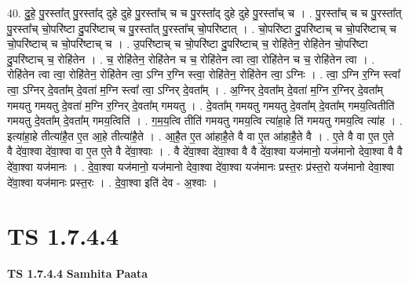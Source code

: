 \documentclass[17pt]{extarticle}
\begin{document}
40. दु॒हे॒ पु॒रस्ता᳚त् पु॒रस्ता᳚द् दुहे दुहे पु॒रस्ता᳚च् च च पु॒रस्ता᳚द् दुहे दुहे पु॒रस्ता᳚च् च । . पु॒रस्ता᳚च् च च पु॒रस्ता᳚त् पु॒रस्ता᳚च् चो॒परि॑ष्टा दु॒परि॑ष्टाच् च पु॒रस्ता᳚त् पु॒रस्ता᳚च् चो॒परि॑ष्टात् । . चो॒परि॑ष्टा दु॒परि॑ष्टाच् च चो॒परि॑ष्टाच् च चो॒परि॑ष्टाच् च चो॒परि॑ष्टाच् च । . उ॒परि॑ष्टाच् च चो॒परि॑ष्टा दु॒परि॑ष्टाच् च॒ रोहि॑तेन॒ रोहि॑तेन चो॒परि॑ष्टा दु॒परि॑ष्टाच् च॒ रोहि॑तेन । . च॒ रोहि॑तेन॒ रोहि॑तेन च च॒ रोहि॑तेन त्वा त्वा॒ रोहि॑तेन च च॒ रोहि॑तेन त्वा । . रोहि॑तेन त्वा त्वा॒ रोहि॑तेन॒ रोहि॑तेन त्वा॒ ऽग्नि र॒ग्नि स्त्वा॒ रोहि॑तेन॒ रोहि॑तेन त्वा॒ ऽग्निः । . त्वा॒ ऽग्नि र॒ग्नि स्त्वा᳚ त्वा॒ ऽग्निर् दे॒वता᳚म् दे॒वता॑ म॒ग्नि स्त्वा᳚ त्वा॒ ऽग्निर् दे॒वता᳚म् । . अ॒ग्निर् दे॒वता᳚म् दे॒वता॑ म॒ग्नि र॒ग्निर् दे॒वता᳚म् गमयतु गमयतु दे॒वता॑ म॒ग्नि र॒ग्निर् दे॒वता᳚म् गमयतु । . दे॒वता᳚म् गमयतु गमयतु दे॒वता᳚म् दे॒वता᳚म् गमय॒त्वितीति॑ गमयतु दे॒वता᳚म् दे॒वता᳚म् गमय॒त्विति॑ । . ग॒म॒य॒त्वि तीति॑ गमयतु गमय॒त्वि त्या॑हा॒हे ति॑ गमयतु गमय॒त्वि त्या॑ह । . इत्या॑हा॒हे तीत्या॑है॒त ए॒त आ॒हे तीत्या॑है॒ते । . आ॒है॒त ए॒त आ॑हाहै॒ते वै वा ए॒त आ॑हाहै॒ते वै । . ए॒ते वै वा ए॒त ए॒ते वै दे॑वा॒श्वा दे॑वा॒श्वा वा ए॒त ए॒ते वै दे॑वा॒श्वाः । . वै दे॑वा॒श्वा दे॑वा॒श्वा वै वै दे॑वा॒श्वा यज॑मानो॒ यज॑मानो देवा॒श्वा वै वै दे॑वा॒श्वा यज॑मानः । . दे॒वा॒श्वा यज॑मानो॒ यज॑मानो देवा॒श्वा दे॑वा॒श्वा यज॑मानः प्रस्त॒रः प्र॑स्त॒रो यज॑मानो देवा॒श्वा दे॑वा॒श्वा यज॑मानः प्रस्त॒रः । . दे॒वा॒श्वा इति॑ देव - अ॒श्वाः । \newline
\pagebreak
{}
\section*{ TS 1.7.4.4 }

\textbf{TS 1.7.4.4 } \newline
\textbf{Samhita Paata} \newline
\end{document}
